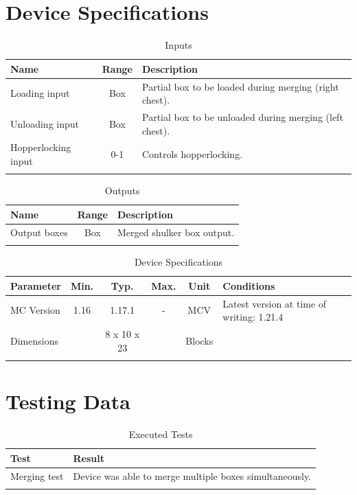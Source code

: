 \documentclass[10pt]{datasheet}
\begin{document}
\onecolumn

\section{Device Specifications}

\begin{table}[H]
    \caption{Inputs}
    \begin{tabularx}{\textwidth}{l | c | X}
        \thickhline
        \textbf{Name} & \textbf{Range} & \textbf{Description} \\
        \hline
        Loading input & Box & Partial box to be loaded during merging (right chest). \\
        \hline
        Unloading input & Box & Partial box to be unloaded during merging (left chest). \\
        \hline
        Hopperlocking input & 0-1 & Controls hopperlocking. \\
        \thickhline
\end{tabularx}
\end{table}

\begin{table}[H]
    \caption{Outputs}
    \begin{tabularx}{\textwidth}{l | c | X}
        \thickhline
        \textbf{Name} & \textbf{Range} & \textbf{Description} \\
        \hline
        Output boxes & Box & Merged shulker box output. \\
        \thickhline
\end{tabularx}
\end{table}

\begin{table}[H]
    \caption{Device Specifications}
    \begin{tabularx}{\textwidth}{l | c c c | c | X}
        \thickhline
        \textbf{Parameter} & \textbf{Min.} & \textbf{Typ.} & \textbf{Max.} &
        \textbf{Unit} & \textbf{Conditions} \\
        \hline
        MC Version & 1.16 & 1.17.1 & - & MCV & Latest version at time of writing: 1.21.4 \\
        \hline
        Dimensions & & 8 x 10 x 23 & & Blocks & \\
        \thickhline
\end{tabularx}
\end{table}
\section{Testing Data}
\begin{table}[H]
\caption{Executed Tests}
\begin{tabularx}{\textwidth}{l | X}
    \thickhline
    \textbf{Test} & \textbf{Result} \\
    \hline
    Merging test & Device was able to merge multiple boxes simultaneously. \\
    \thickhline
\end{tabularx}
\end{table}
\end{document}
